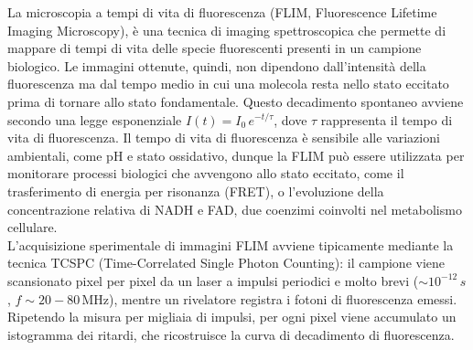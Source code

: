 \documentclass[a4paper, 11pt]{article}
\begin{document}
La microscopia a tempi di vita di fluorescenza (FLIM, Fluorescence Lifetime Imaging Microscopy), è una tecnica di imaging spettroscopica che permette di mappare di tempi di vita delle specie fluorescenti presenti in un campione biologico. Le immagini ottenute, quindi, non dipendono dall'intensità della fluorescenza ma dal tempo medio in cui una molecola resta nello stato eccitato prima di tornare allo stato fondamentale. Questo decadimento spontaneo avviene secondo una legge esponenziale $I(t)=I_0\,e^{-t/\tau}$, dove $\tau$ rappresenta il tempo di vita di fluorescenza.
Il tempo di vita di fluorescenza è sensibile alle variazioni ambientali, come pH e stato ossidativo, dunque la FLIM può essere utilizzata per monitorare processi biologici che avvengono allo stato eccitato, come  il trasferimento di energia per risonanza (FRET), o l'evoluzione della concentrazione relativa di NADH e FAD, due coenzimi coinvolti nel metabolismo cellulare.\\
L'acquisizione sperimentale di immagini FLIM avviene tipicamente mediante la tecnica TCSPC (Time-Correlated Single Photon Counting): il campione viene scansionato pixel per pixel da un laser a impulsi periodici e molto brevi ($\sim 10^{-12}\,s$, $f\sim 20-80\,\text{MHz}$), mentre un rivelatore registra i fotoni di fluorescenza emessi.
Ripetendo la misura per migliaia di impulsi, per ogni pixel viene accumulato un istogramma dei ritardi, che ricostruisce la curva di decadimento di fluorescenza.
\end{document}

